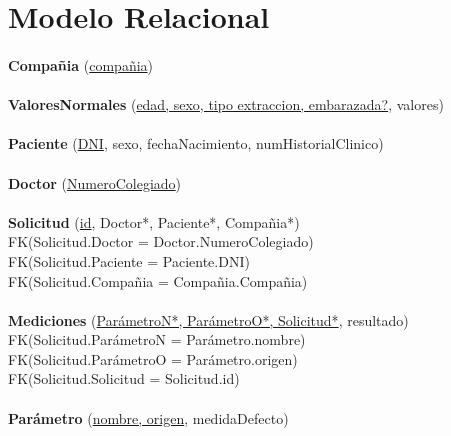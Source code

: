 \documentclass[a4paper,10pt]{article}
\newcommand\tab[1][1cm]{\hspace*{#1}}
\begin{document}
\pagebreak
\section{Modelo Relacional}

\paragraph{}
{\bf Compañia} (\underline{compañia})

\paragraph{}
{\bf ValoresNormales} (\underline{edad, sexo, tipo extraccion, embarazada?}, valores)

\paragraph{}
{\bf Paciente} (\underline{DNI}, sexo, fechaNacimiento, numHistorialClinico)

\paragraph{}
{\bf Doctor} (\underline{NumeroColegiado})

\paragraph{}
{\bf Solicitud} (\underline{id}, Doctor*, Paciente*, Compañia*)\\
\tab FK(Solicitud.Doctor = Doctor.NumeroColegiado)\\
\tab FK(Solicitud.Paciente = Paciente.DNI)\\
\tab FK(Solicitud.Compañia = Compañia.Compañia)

\paragraph{}
{\bf Mediciones} (\underline{ParámetroN*, ParámetroO*, Solicitud*}, resultado)\\
\tab FK(Solicitud.ParámetroN = Parámetro.nombre)\\
\tab FK(Solicitud.ParámetroO = Parámetro.origen)\\
\tab FK(Solicitud.Solicitud = Solicitud.id)

\paragraph{}
{\bf Parámetro} (\underline{nombre, origen}, medidaDefecto)
\end{document}
